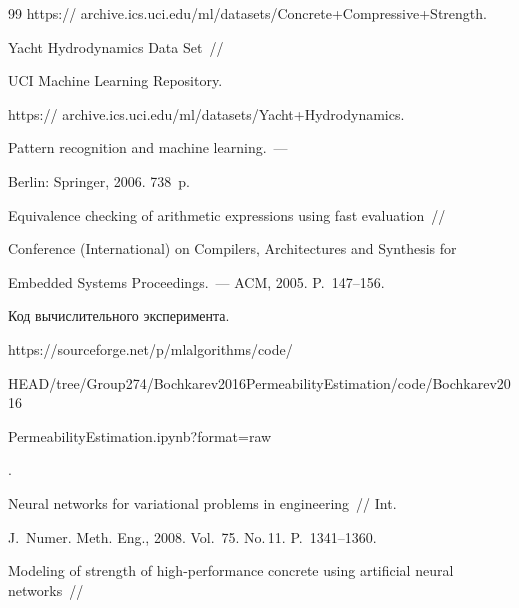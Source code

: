 {{\begin{thebibliography}{99}
 {\sf https:// archive.ics.uci.edu/ml/datasets/Concrete+Compressive+Strength}.

    


    Yacht Hydrodynamics Data Set~/\!\!/

 UCI Machine Learning Repository.

{\sf https:// archive.ics.uci.edu/ml/datasets/Yacht+Hydrodynamics}.

    



   Pattern recognition and machine learning.~---

 Berlin: Springer, 2006. 738~p.

    



Equivalence checking of arithmetic expressions using fast evaluation~/\!\!/ 

 Conference (International) on Compilers, Architectures and Synthesis for 

Embedded Systems Proceedings.~--- ACM, 2005. P.~147--156.

    


    Код вычислительного эксперимента.

{\sf https://sourceforge.net/p/mlalgorithms/code/\linebreak

HEAD/tree/Group274/Bochkarev2016PermeabilityEstimation/code/Bochkarev2016\linebreak

PermeabilityEstimation.ipynb?format=raw}.

    



Neural networks for variational problems in engineering~/\!\!/ Int. 

J.~Numer. Meth. Eng., 2008. Vol.~75. No.\,11. P.~1341--1360.

    



   Modeling of strength of high-performance concrete using artificial neural networks~/\!\!/ 


\end{thebibliography}}}
